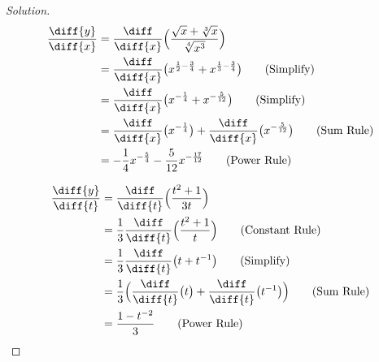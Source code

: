 \documentclass[crop=false,class=article,oneside]{standalone}
\begin{document}
            \begin{proof}[Solution]
                \par\hfill\par
                \begin{minipage}[b]{.49\textwidth}
                    \centering
                    \begin{align*}
                        \frac{\diff{y}}{\diff{x}}
                        &=\frac{\diff}{\diff{x}}\Big(
                            \frac{\sqrt{x}+\sqrt[3]{x}}
                                 {\sqrt[4]{x^{3}}}
                            \Big)\\
                        &=\frac{\diff}{\diff{x}}\big(
                                x^{\frac{1}{2}-\frac{3}{4}}+
                                x^{\frac{1}{3}-\frac{3}{4}}
                            \big)
                            \tag{Simplify}\\
                        &=\frac{\diff}{\diff{x}}\big(
                                x^{-\frac{1}{4}}+
                                x^{-\frac{5}{12}}
                            \big)
                            \tag{Simplify}\\
                        &=\frac{\diff}{\diff{x}}\big(
                                x^{-\frac{1}{4}}\big)+
                                \frac{\diff}{\diff{x}}
                                \big(x^{-\frac{5}{12}}
                            \big)
                            \tag{Sum Rule}\\
                        &=-\frac{1}{4}x^{-\frac{5}{4}}-
                            \frac{5}{12}x^{-\frac{17}{12}}
                            \tag{Power Rule}
                    \end{align*}
                \end{minipage}
                \hfill
                \vline
                \begin{minipage}[b]{.49\textwidth}
                    \centering
                    \begin{align*}
                        \frac{\diff{y}}{\diff{t}}
                        &=\frac{\diff}{\diff{t}}
                            \Big(\frac{t^{2}+1}{3t}\Big)\\
                        &=\frac{1}{3}\frac{\diff}{\diff{t}}
                            \Big(\frac{t^{2}+1}{t}\Big)
                            \tag{Constant Rule}\\
                        &=\frac{1}{3}\frac{\diff}{\diff{t}}
                            \big(t+t^{-1}\big)
                            \tag{Simplify}\\
                        &=\frac{1}{3}\Big(\frac{\diff}{\diff{t}}
                            \big(t\big)
                        +\frac{\diff}{\diff{t}}
                            \big(t^{-1}\big)\Big)
                            \tag{Sum Rule}\\
                        &=\frac{1-t^{-2}}{3}\tag{Power Rule}
                    \end{align*}
                \end{minipage}
            \end{proof}
\end{document}
